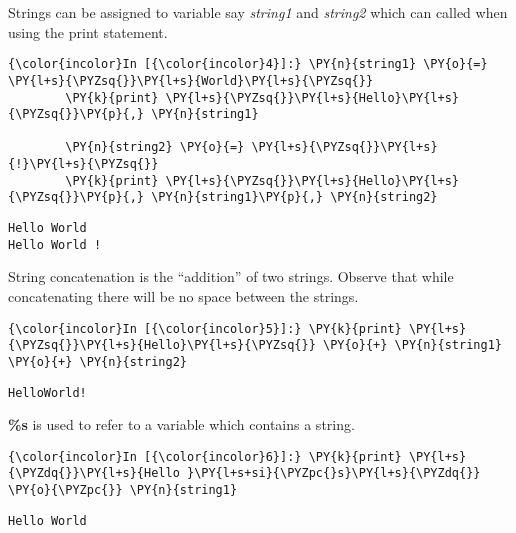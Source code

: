     Strings can be assigned to variable say \emph{string1} and
\emph{string2} which can called when using the print statement.

    \begin{Verbatim}[commandchars=\\\{\}]
{\color{incolor}In [{\color{incolor}4}]:} \PY{n}{string1} \PY{o}{=} \PY{l+s}{\PYZsq{}}\PY{l+s}{World}\PY{l+s}{\PYZsq{}}
        \PY{k}{print} \PY{l+s}{\PYZsq{}}\PY{l+s}{Hello}\PY{l+s}{\PYZsq{}}\PY{p}{,} \PY{n}{string1}
        
        \PY{n}{string2} \PY{o}{=} \PY{l+s}{\PYZsq{}}\PY{l+s}{!}\PY{l+s}{\PYZsq{}}
        \PY{k}{print} \PY{l+s}{\PYZsq{}}\PY{l+s}{Hello}\PY{l+s}{\PYZsq{}}\PY{p}{,} \PY{n}{string1}\PY{p}{,} \PY{n}{string2}
\end{Verbatim}

    \begin{Verbatim}[commandchars=\\\{\}]
Hello World
Hello World !
    \end{Verbatim}

    String concatenation is the ``addition'' of two strings. Observe that
while concatenating there will be no space between the strings.

    \begin{Verbatim}[commandchars=\\\{\}]
{\color{incolor}In [{\color{incolor}5}]:} \PY{k}{print} \PY{l+s}{\PYZsq{}}\PY{l+s}{Hello}\PY{l+s}{\PYZsq{}} \PY{o}{+} \PY{n}{string1} \PY{o}{+} \PY{n}{string2}
\end{Verbatim}

    \begin{Verbatim}[commandchars=\\\{\}]
HelloWorld!
    \end{Verbatim}

    \textbf{\%s} is used to refer to a variable which contains a string.

    \begin{Verbatim}[commandchars=\\\{\}]
{\color{incolor}In [{\color{incolor}6}]:} \PY{k}{print} \PY{l+s}{\PYZdq{}}\PY{l+s}{Hello }\PY{l+s+si}{\PYZpc{}s}\PY{l+s}{\PYZdq{}} \PY{o}{\PYZpc{}} \PY{n}{string1}
\end{Verbatim}

    \begin{Verbatim}[commandchars=\\\{\}]
Hello World
    \end{Verbatim}

